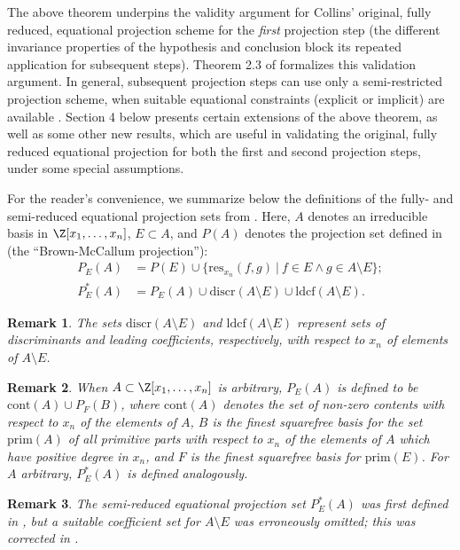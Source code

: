 \documentclass{article}
\newtheorem{remark}{Remark}
\begin{document}
The above theorem underpins the validity argument for Collins'
original, fully reduced, equational projection scheme for the
\emph{first} projection step (the different invariance properties of the hypothesis and conclusion block its repeated application for subsequent steps).
Theorem 2.3 of \cite{McCallum1999} formalizes this validation argument.
In general, subsequent projection steps
can use only a semi-restricted projection scheme, when
suitable equational constraints (explicit or implicit) are available
\cite{McCallum2001, EBD2020}. Section 4 below presents certain
extensions of the above theorem, as well as some other new results, 
which are useful in validating
the original, fully reduced equational projection for both the first
and second projection steps, under some special assumptions.

For the reader's convenience, we summarize below the definitions of
the fully- and semi-reduced equational projection sets
from \cite{McCallum1999, McCallum2001, EBD2020}.
Here, $A$ denotes an irreducible basis in $\Z[x_1, \ldots, x_n]$,
$E \subset A$, and $P(A)$ denotes the projection set defined
in \cite{Brown2001} (the ``Brown-McCallum projection''):
\begin{align*}
P_E(A) &= P(E) \cup \{\mathrm{res}_{x_n} (f,g)~|~ f \in E \wedge
                        g \in A \setminus E\}; \\
P_E^*(A) &= P_E(A) \cup \mathrm{discr}(A \setminus E)
                    \cup \mathrm{ldcf}(A \setminus E).
\end{align*}
\begin{remark}
    The sets $\mathrm{discr}(A \setminus E)$ and 
    $\mathrm{ldcf}(A \setminus E)$ represent sets of discriminants
    and leading coefficients, respectively, with respect to $x_n$ of elements of $A \setminus E$.
\end{remark}
\begin{remark}
    When $A \subset \Z[x_1, \ldots, x_n]$ is arbitrary, $P_E(A)$ is
    defined to be $\mathrm{cont}(A) \cup P_F(B)$, where 
    $\mathrm{cont}(A)$ denotes the set of non-zero contents with respect to $x_n$ of the elements of $A$, $B$ is the finest squarefree basis 
    for the set $\mathrm{prim}(A)$ of all primitive parts with respect to
    $x_n$ of the elements of $A$ which have positive degree in $x_n$,
    and $F$ is the finest squarefree basis for $\mathrm{prim}(E)$.
    For $A$ arbitrary, $P_E^*(A)$ is defined analogously.
\end{remark}
\begin{remark}
    The semi-reduced equational projection set $P_E^*(A)$ was first defined in \cite{McCallum2001}, 
    but a suitable coefficient set for $A \setminus E$
    was erroneously omitted; this was corrected in \cite{EBD2020}.
\end{remark}
\end{document}
